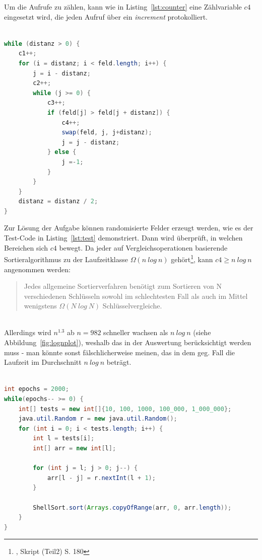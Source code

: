 Um die Aufrufe zu zählen, kann wie in Listing~\ref{lst:counter} eine Zählvariable $c4$ eingesetzt wird, die jeden Aufruf über ein \textit{increment} protokolliert.

\begin{lstlisting}[language=java,caption={Zur Protokollierung der Aufrufe können in dem Code Zählvariablen eingesetzt werden ($c1, .. ,c4$).},label=lst:counter]

while (distanz > 0) {
    c1++;
    for (i = distanz; i < feld.length; i++) {
        j = i - distanz;
        c2++;
        while (j >= 0) {
            c3++;
            if (feld[j] > feld[j + distanz]) {
                c4++;
                swap(feld, j, j+distanz);
                j = j - distanz;
            } else {
                j =-1;
            }
        }
    }
    distanz = distanz / 2;
}

\end{lstlisting}

Zur Lösung der Aufgabe können randomisierte Felder erzeugt werden, wie es der Test-Code in Listing~\ref{lst:test} demonstriert. Dann wird überprüft, in welchen Bereichen sich $c4$ bewegt.
Da jeder auf Vergleichsoperationen basierende Sortieralgorithmus zu der Laufzeitklasse $\Omega(n\ log\ n)$ gehört\footnote{\cite[154]{OW17b}, Skript (Teil2) S. 180}, kann $c4 \geq n\ log\ n$ angenommen werden:

\blockquote[{\cite[154, Satz 2.4]{OW17b}}]{
Jedes allgemeine Sortierverfahren benötigt zum Sortieren von N verschiedenen Schlüsseln sowohl im schlechtesten Fall als auch im Mittel wenigstens $\Omega(N\ log\ N)$
Schlüsselvergleiche.
}\\

Allerdings wird $n^{1.3}$ ab $n=982$ schneller wachsen als $n\ log\ n$ (siehe Abbildung~\ref{fig:lognplot}), weshalb das in der Auswertung berücksichtigt werden muss - man könnte sonst fälschlicherweise meinen, das in dem geg. Fall die Laufzeit im Durchschnitt $n\ log\ n$ beträgt.

\begin{lstlisting}[language=java,caption={Code zum Erzeugen randomisierter Felder zum Testen von Shellsort.},label=lst:test]

int epochs = 2000;
while(epochs-- >= 0) {
    int[] tests = new int[]{10, 100, 1000, 100_000, 1_000_000};
    java.util.Random r = new java.util.Random();
    for (int i = 0; i < tests.length; i++) {
        int l = tests[i];
        int[] arr = new int[l];

        for (int j = l; j > 0; j--) {
            arr[l - j] = r.nextInt(l + 1);
        }

        ShellSort.sort(Arrays.copyOfRange(arr, 0, arr.length));
    }
}
\end{lstlisting}


